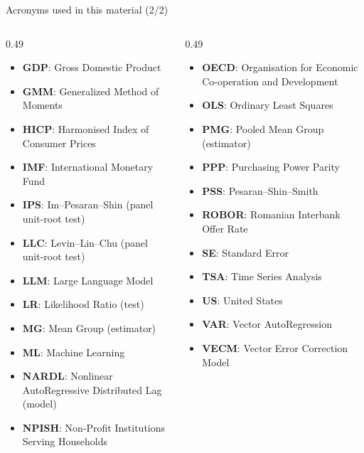 \begin{frame}{Acronyms used in this material (2/2)}
\begin{columns}[T]
\begin{column}{0.49\textwidth}
\begin{itemize}\setlength{\itemsep}{0pt}
    \item \textbf{GDP}: Gross Domestic Product
    \item \textbf{GMM}: Generalized Method of Moments
    \item \textbf{HICP}: Harmonised Index of Consumer Prices
    \item \textbf{IMF}: International Monetary Fund
    \item \textbf{IPS}: Im–Pesaran–Shin (panel unit-root test)
    \item \textbf{LLC}: Levin–Lin–Chu (panel unit-root test)
    \item \textbf{LLM}: Large Language Model
    \item \textbf{LR}: Likelihood Ratio (test)
    \item \textbf{MG}: Mean Group (estimator)
    \item \textbf{ML}: Machine Learning
    \item \textbf{NARDL}: Nonlinear AutoRegressive Distributed Lag (model)
    \item \textbf{NPISH}: Non-Profit Institutions Serving Households
\end{itemize}
\end{column}
\begin{column}{0.49\textwidth}
\begin{itemize}\setlength{\itemsep}{0pt}
    \item \textbf{OECD}: Organisation for Economic Co-operation and Development
    \item \textbf{OLS}: Ordinary Least Squares
    \item \textbf{PMG}: Pooled Mean Group (estimator)
    \item \textbf{PPP}: Purchasing Power Parity
    \item \textbf{PSS}: Pesaran–Shin–Smith
    \item \textbf{ROBOR}: Romanian Interbank Offer Rate
    \item \textbf{SE}: Standard Error
    \item \textbf{TSA}: Time Series Analysis
    \item \textbf{US}: United States
    \item \textbf{VAR}: Vector AutoRegression
    \item \textbf{VECM}: Vector Error Correction Model
\end{itemize}
\end{column}
\end{columns}
\end{frame}

